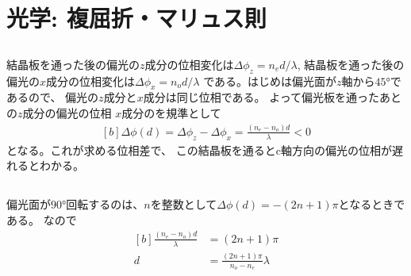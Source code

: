 \documentclass[../ap_2008.tex]{subfiles}
\begin{document}
\chapter{光学: 複屈折・マリュス則}
\section{}
結晶板を通った後の偏光の\(z\)成分の位相変化は\(\Delta\phi_z=n_ed/\lambda\),
結晶板を通った後の偏光の\(x\)成分の位相変化は\(\Delta\phi_x=n_od/\lambda\)
である。はじめは偏光面が\(z\)軸から\(\ang{45}\)であるので、
偏光の\(z\)成分と\(x\)成分は同じ位相である。
よって偏光板を通ったあとの\(z\)成分の偏光の位相
\(x\)成分のを規準として
\begin{equation}\begin{aligned}[b]
    \Delta\phi(d)=\Delta\phi_z -\Delta\phi_x = \frac{(n_e-n_o)d}{\lambda}<0
\end{aligned}\end{equation}
となる。これが求める位相差で、
この結晶板を通るとc軸方向の偏光の位相が遅れるとわかる。

\section{}
偏光面が\(\ang{90}\)回転するのは、\(n\)を整数として\(\Delta\phi(d)= -(2n+1)\pi\)となるときである。
なので
\begin{equation}\begin{aligned}[b]
    \frac{(n_e-n_o)d}{\lambda} &= (2n+1)\pi\\
    d &=\frac{(2n+1)\pi}{n_o-n_e}\lambda
\end{aligned}\end{equation}
\end{document}
